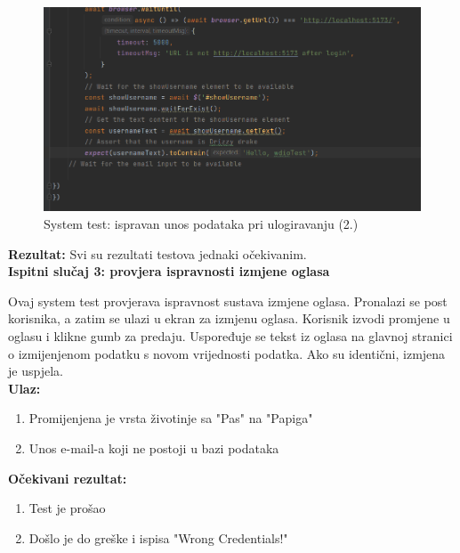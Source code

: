 			\begin{figure}[H]
				\includegraphics[scale=0.7]{slike/syslogin2.PNG} 
				\centering
				\caption{System test: ispravan unos podataka pri ulogiravanju (2.)}
				\label{dijagram_razmjestaja}
			\end{figure}
			
			\textbf{Rezultat:}
			Svi su rezultati testova jednaki očekivanim.\\
			
			\textbf{Ispitni slučaj 3: provjera ispravnosti izmjene oglasa}
			
			Ovaj system test provjerava ispravnost sustava izmjene oglasa. Pronalazi se post korisnika, a zatim se ulazi u ekran za izmjenu oglasa. Korisnik izvodi promjene u oglasu i klikne gumb za predaju. Uspoređuje se tekst iz oglasa na glavnoj stranici o izmijenjenom podatku s novom vrijednosti podatka. Ako su identični, izmjena je uspjela. \\
			
			\textbf{Ulaz:}
			
				\begin{enumerate}
					\item Promijenjena je vrsta životinje sa "Pas" na "Papiga"
					\item Unos e-mail-a koji ne postoji u bazi podataka
				\end{enumerate}
				
			\textbf{Očekivani rezultat:}
			
				\begin{enumerate}
					\item Test je prošao
					\item Došlo je do greške i ispisa "Wrong Credentials!"
				\end{enumerate}
			
